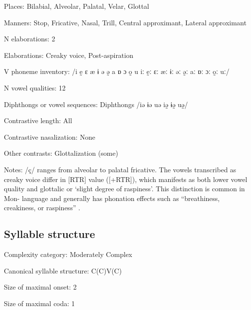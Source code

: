 {\begin{appendixdesc}
\item[Places:] Bilabial, Alveolar, Palatal, Velar, Glottal

\item[Manners:] Stop, Fricative, Nasal, Trill, Central approximant, Lateral approximant

\item[N elaborations:] 2

\item[Elaborations:] Creaky voice, Post-aspiration

\item[V phoneme inventory:] /i ḛ ɛ æ ɨ ə ə̰ a ɒ ɔ o̰ u iː ḛː ɛː æː ɨː əː ə̰ː aː ɒː ɔː o̰ː uː/

\item[N vowel qualities:] 12

\item[Diphthongs or vowel sequences:] Diphthongs /iə ɨə uə iə̰ ɨə̰ uə̰/

\item[Contrastive length:] All

\item[Contrastive nasalization:] None

\item[Other contrasts:] Glottalization (some)

\item[Notes:] /ç/ ranges from alveolar to palatal fricative. The vowels transcribed as creaky voice differ in [RTR] value ([+RTR]), which manifests as both lower vowel quality and glottalic or ‘slight degree of raspiness’. This distinction is common in Mon- language and generally has phonation effects such as “breathiness, creakiness, or raspiness” \citep[14]{Alves2006}.
\end{appendixdesc}
\subsection*{Syllable structure}
\begin{appendixdesc}

\item[Complexity category:] Moderately Complex

\item[Canonical syllable structure:] C(C)V(C) \citep[17--21]{Alves2006}

\item[Size of maximal onset:] 2

\item[Size of maximal coda:] 1


\end{appendixdesc}}

